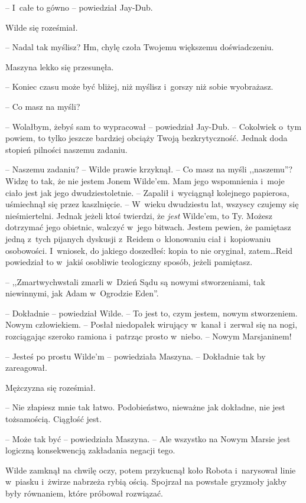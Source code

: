 \documentclass[oneside,polish,11pt,sfheadings]{mwbk}
\begin{document}
-- I~całe to gówno -- powiedział Jay-Dub.

Wilde się roześmiał. 

-- Nadal tak myślisz? Hm, chylę czoła Twojemu
większemu doświadczeniu.

Maszyna lekko się przesunęła. 

-- Koniec czasu może być bliżej, niż
myślisz i~gorszy niż sobie wyobrażasz.

-- Co masz na myśli?

-- Wolałbym, żebyś sam to wypracował -- powiedział Jay-Dub. -- Cokolwiek o~tym powiem, to tylko jeszcze bardziej obciąży Twoją bezkrytyczność.
Jednak doda stopień pilności naszemu zadaniu.

-- Naszemu zadaniu? -- Wilde prawie krzyknął. -- Co masz na myśli
,,naszemu''? Widzę to tak, że nie jestem Jonem Wilde'em. Mam jego
wspomnienia i~moje ciało jest jak jego dwudziestoletnie. -- Zapalił i~wyciągnął kolejnego papierosa, uśmiechnął się przez kaszlnięcie. -- W~wieku dwudziestu lat, wszyscy czujemy się nieśmiertelni. Jednak jeżeli
ktoś twierdzi, że \emph{jest} Wilde'em, to Ty. Możesz dotrzymać jego
obietnic, walczyć w~jego bitwach. Jestem pewien, że pamiętasz jedną z~tych pijanych dyskusji z~Reidem o~klonowaniu ciał i~kopiowaniu
osobowości. I~wniosek, do jakiego doszedłeś: kopia to nie oryginał,
zatem\ldots Reid powiedział to w~jakiś osobliwie teologiczny sposób, jeżeli
pamiętasz.

-- ,,Zmartwychwstali zmarli w~Dzień Sądu są nowymi stworzeniami, tak
niewinnymi, jak Adam w~Ogrodzie Eden''.

-- Dokładnie -- powiedział Wilde. -- To jest to, czym jestem, nowym
stworzeniem. Nowym człowiekiem. -- Posłał niedopałek wirujący w~kanał i~zerwał się na nogi, rozciągając szeroko ramiona i~patrząc prosto w~niebo. -- Nowym Marsjaninem!

-- Jesteś po prostu Wilde'm -- powiedziała Maszyna. -- Dokładnie tak by
zareagował.

Mężczyzna się roześmiał. 

-- Nie złapiesz mnie tak łatwo. Podobieństwo,
nieważne jak dokładne, nie jest tożsamością. Ciągłość jest.

-- Może tak być -- powiedziała Maszyna. -- Ale wszystko na Nowym Marsie
jest logiczną konsekwencją zakładania negacji tego.

Wilde zamknął na chwilę oczy, potem przykucnął koło Robota i~narysował
linie w~piasku i~żwirze nabrzeża rybią ością. Spojrzał na powstałe
gryzmoły jakby były równaniem, które próbował rozwiązać.
\end{document}
